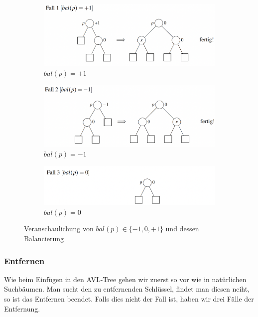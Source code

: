\documentclass[a4paper]{article}
\begin{document}
\begin{figure}[h!]
\centering
\begin{subfigure}{0.6\textwidth}
    \includegraphics[width=\textwidth]{Pictures/AVL-bal(+1).png}
        \caption{$bal(p) = +1$}
        \label{fig: bal(p) = +1}
\end{subfigure}
\hfill
\begin{subfigure}{0.6\textwidth}
    \includegraphics[width=\textwidth]{Pictures/AVL-bal(-1).png}
        \caption{$bal(p) = -1$}
        \label{fig: bal(p) = -1}
\end{subfigure}

\begin{subfigure}{0.6\textwidth}
    \includegraphics[width=\textwidth]{Pictures/AVL-bal(0).png}
        \caption{$bal(p) = 0$}
        \label{fig: bal(p) = 0}
\end{subfigure}
        
\caption{Veranschaulichung von $bal(p) \in \{-1, 0, +1\}$ und dessen Balancierung}
\label{fig: bal(p) für alle}
\end{figure}

\newpage
\subsubsection{Entfernen}\label{subsection EntfernenAVL}
Wie beim Einfügen in den AVL-Tree gehen wir zuerst so vor wie in natürlichen Suchbäumen. Man sucht den zu entfernenden Schlüssel, findet man diesen nciht, so ist das Entfernen beendet. Falls dies nicht der Fall ist, haben wir drei Fälle der Entfernung. 
\end{document}
